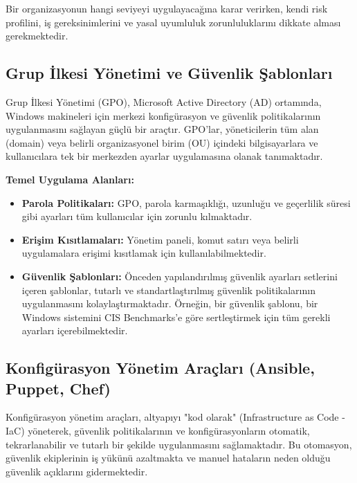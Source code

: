 Bir organizasyonun hangi seviyeyi uygulayacağına karar verirken, kendi risk profilini, iş gereksinimlerini ve yasal uyumluluk zorunluluklarını dikkate alması gerekmektedir.

\subsection{Grup İlkesi Yönetimi ve Güvenlik Şablonları}

Grup İlkesi Yönetimi (GPO), Microsoft Active Directory (AD) ortamında, Windows makineleri için merkezi konfigürasyon ve güvenlik politikalarının uygulanmasını sağlayan güçlü bir araçtır. GPO'lar, yöneticilerin tüm alan (domain) veya belirli organizasyonel birim (OU) içindeki bilgisayarlara ve kullanıcılara tek bir merkezden ayarlar uygulamasına olanak tanımaktadır.

\textbf{Temel Uygulama Alanları:}
\begin{itemize}
    \item \textbf{Parola Politikaları:} GPO, parola karmaşıklığı, uzunluğu ve geçerlilik süresi gibi ayarları tüm kullanıcılar için zorunlu kılmaktadır.
    \item \textbf{Erişim Kısıtlamaları:} Yönetim paneli, komut satırı veya belirli uygulamalara erişimi kısıtlamak için kullanılabilmektedir.
    \item \textbf{Güvenlik Şablonları:} Önceden yapılandırılmış güvenlik ayarları setlerini içeren şablonlar, tutarlı ve standartlaştırılmış güvenlik politikalarının uygulanmasını kolaylaştırmaktadır. Örneğin, bir güvenlik şablonu, bir Windows sistemini CIS Benchmarks'e göre sertleştirmek için tüm gerekli ayarları içerebilmektedir.
\end{itemize}

\subsection{Konfigürasyon Yönetim Araçları (Ansible, Puppet, Chef)}

Konfigürasyon yönetim araçları, altyapıyı "kod olarak" (Infrastructure as Code - IaC) yöneterek, güvenlik politikalarının ve konfigürasyonların otomatik, tekrarlanabilir ve tutarlı bir şekilde uygulanmasını sağlamaktadır. Bu otomasyon, güvenlik ekiplerinin iş yükünü azaltmakta ve manuel hataların neden olduğu güvenlik açıklarını gidermektedir.

